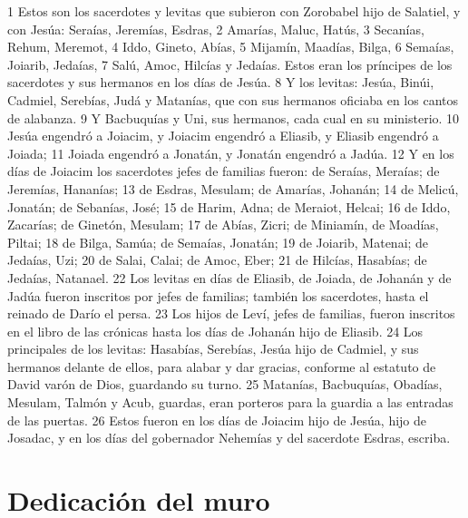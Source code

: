 1 Estos son los sacerdotes y levitas que subieron con Zorobabel hijo de Salatiel, y con Jesúa: Seraías, Jeremías, Esdras,
2 Amarías, Maluc, Hatús,
3 Secanías, Rehum, Meremot, 
4 Iddo, Gineto, Abías,
5 Mijamín, Maadías, Bilga,
6 Semaías, Joiarib, Jedaías,
7 Salú, Amoc, Hilcías y Jedaías. Estos eran los príncipes de los sacerdotes y sus hermanos en los días de Jesúa.
8 Y los levitas: Jesúa, Binúi, Cadmiel, Serebías, Judá y Matanías, que con sus hermanos oficiaba en los cantos de alabanza.
9 Y Bacbuquías y Uni, sus hermanos, cada cual en su ministerio.
10 Jesúa engendró a Joiacim, y Joiacim engendró a Eliasib, y Eliasib engendró a Joiada;
11 Joiada engendró a Jonatán, y Jonatán engendró a Jadúa.
12 Y en los días de Joiacim los sacerdotes jefes de familias fueron: de Seraías, Meraías; de Jeremías, Hananías;
13 de Esdras, Mesulam; de Amarías, Johanán;
14 de Melicú, Jonatán; de Sebanías, José;
15 de Harim, Adna; de Meraiot, Helcai;
16 de Iddo, Zacarías; de Ginetón, Mesulam;
17 de Abías, Zicri; de Miniamín, de Moadías, Piltai;
18 de Bilga, Samúa; de Semaías, Jonatán;
19 de Joiarib, Matenai; de Jedaías, Uzi;
20 de Salai, Calai; de Amoc, Eber;
21 de Hilcías, Hasabías; de Jedaías, Natanael.
22 Los levitas en días de Eliasib, de Joiada, de Johanán y de Jadúa fueron inscritos por jefes de familias; también los sacerdotes, hasta el reinado de Darío el persa.
23 Los hijos de Leví, jefes de familias, fueron inscritos en el libro de las crónicas hasta los días de Johanán hijo de Eliasib.
24 Los principales de los levitas: Hasabías, Serebías, Jesúa hijo de Cadmiel, y sus hermanos delante de ellos, para alabar y dar gracias, conforme al estatuto de David varón de Dios, guardando su turno.
25 Matanías, Bacbuquías, Obadías, Mesulam, Talmón y Acub, guardas, eran porteros para la guardia a las entradas de las puertas.
26 Estos fueron en los días de Joiacim hijo de Jesúa, hijo de Josadac, y en los días del gobernador Nehemías y del sacerdote Esdras, escriba.

\section*{Dedicación del muro}

